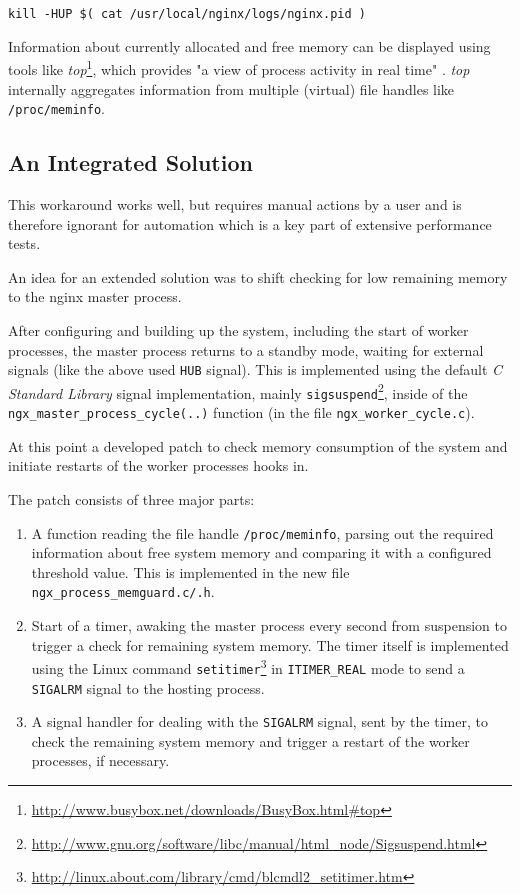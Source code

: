 \begin{verbatim}
kill -HUP $( cat /usr/local/nginx/logs/nginx.pid )
\end{verbatim}

Information about currently allocated and free memory can be displayed using tools like \textit{top}\footnote{\url{http://www.busybox.net/downloads/BusyBox.html\#top}}, which provides "a view of process activity in real time" \cite{busybox}. \textit{top} internally aggregates information from multiple (virtual) file handles like \texttt{/proc/meminfo}.

\subsection{An Integrated Solution}

This workaround works well, but requires manual actions by a user and is therefore ignorant for automation which is a key part of extensive performance tests.

An idea for an extended solution was to shift checking for low remaining memory to the nginx master process.

After configuring and building up the system, including the start of worker processes, the master process returns to a standby mode, waiting for external signals (like the above used \texttt{HUB} signal). This is implemented using the default \textit{C Standard Library} signal implementation, mainly \texttt{sigsuspend}\footnote{\url{http://www.gnu.org/software/libc/manual/html\_node/Sigsuspend.html}}, inside of the \texttt{ngx\_master\_process\_cycle(..)} function (in the file \texttt{ngx\_worker\_cycle.c}).

At this point a developed patch to check memory consumption of the system and initiate restarts of the worker processes hooks in. 

The patch consists of three major parts:

\begin{enumerate}
\item A function reading the file handle \texttt{/proc/meminfo}, parsing out the required information about free system memory and comparing it with a configured threshold value. This is implemented in the new file \texttt{ngx\_process\_memguard.c/.h}.

\item Start of a timer, awaking the master process every second from suspension to trigger a check for remaining system memory. The timer itself is implemented using the Linux command \texttt{setitimer}\footnote{\url{http://linux.about.com/library/cmd/blcmdl2\_setitimer.htm}} in \texttt{ITIMER\_REAL} mode to send a \texttt{SIGALRM} signal to the hosting process.

\item A signal handler for dealing with the \texttt{SIGALRM} signal, sent by the timer, to check the remaining system memory and trigger a restart of the worker processes, if necessary.
\end{enumerate}


